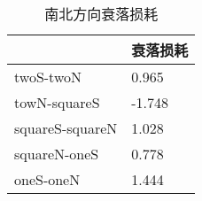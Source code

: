\begin{table}[htbp]
\centering
\begin{tabular}{ll}
\toprule 
                & 衰落损耗   \\ 
\midrule
twoS-twoN       & 0.965  \\     
towN-squareS    & -1.748 \\     
squareS-squareN & 1.028  \\     
squareN-oneS    & 0.778  \\     
oneS-oneN       & 1.444 \\
\bottomrule
\end{tabular}
\caption{南北方向衰落损耗}
  \label{table:sorth-north-delta}
\end{table}
